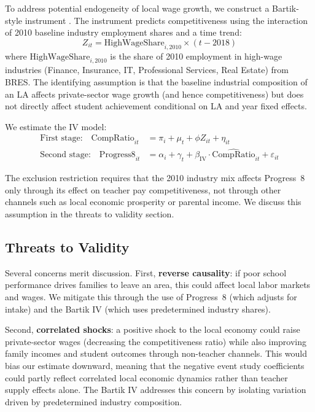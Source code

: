 \documentclass[12pt]{article}
\begin{document}
To address potential endogeneity of local wage growth, we construct a Bartik-style instrument \citep{goldsmith2020bartik}. The instrument predicts competitiveness using the interaction of 2010 baseline industry employment shares and a time trend:
\begin{equation}
\label{eq:bartik}
Z_{it} = \text{HighWageShare}_{i,2010} \times (t - 2018)
\end{equation}
where $\text{HighWageShare}_{i,2010}$ is the share of 2010 employment in high-wage industries (Finance, Insurance, IT, Professional Services, Real Estate) from BRES. The identifying assumption is that the baseline industrial composition of an LA affects private-sector wage growth (and hence competitiveness) but does not directly affect student achievement conditional on LA and year fixed effects.

We estimate the IV model:
\begin{align}
\text{First stage:} \quad \text{CompRatio}_{it} &= \pi_i + \mu_t + \phi Z_{it} + \eta_{it} \label{eq:fs} \\
\text{Second stage:} \quad \text{Progress8}_{it} &= \alpha_i + \gamma_t + \beta_{\text{IV}} \cdot \widehat{\text{CompRatio}}_{it} + \varepsilon_{it} \label{eq:ss}
\end{align}

The exclusion restriction requires that the 2010 industry mix affects Progress~8 only through its effect on teacher pay competitiveness, not through other channels such as local economic prosperity or parental income. We discuss this assumption in the threats to validity section.

\subsection{Threats to Validity}

Several concerns merit discussion. First, \textbf{reverse causality}: if poor school performance drives families to leave an area, this could affect local labor markets and wages. We mitigate this through the use of Progress~8 (which adjusts for intake) and the Bartik IV (which uses predetermined industry shares).

Second, \textbf{correlated shocks}: a positive shock to the local economy could raise private-sector wages (decreasing the competitiveness ratio) while also improving family incomes and student outcomes through non-teacher channels. This would bias our estimate downward, meaning that the negative event study coefficients could partly reflect correlated local economic dynamics rather than teacher supply effects alone. The Bartik IV addresses this concern by isolating variation driven by predetermined industry composition.
\end{document}
